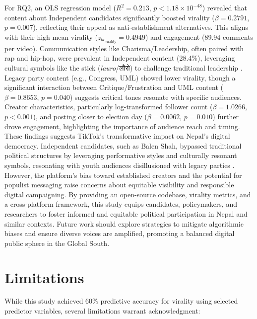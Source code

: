 \documentclass[12pt,a4paper]{report}
\begin{document}
For RQ2, an OLS regression model ($R^2 = 0.213$, $p < 1.18 \times 10^{-48}$) revealed that content about Independent candidates significantly boosted virality ($\beta = 0.2791$, $p = 0.007$), reflecting their appeal as anti-establishment alternatives. This aligns with their high mean virality ($z_{bc_{\text{virality}}} = 0.4949$) and engagement (89.94 comments per video). Communication styles like Charisma/Leadership, often paired with rap and hip-hop, were prevalent in Independent content (28.4\%), leveraging cultural symbols like the stick (\textit{lauro}/\texthindi{लौरो}) to challenge traditional leadership \parencite{AnnapurnaExpress2022}. Legacy party content (e.g., Congress, UML) showed lower virality, though a significant interaction between Critique/Frustration and UML content ($\beta = 0.8653$, $p = 0.040$) suggests critical tones resonate with specific audiences. Creator characteristics, particularly log-transformed follower count ($\beta = 1.0266$, $p < 0.001$), and posting closer to election day ($\beta = 0.0062$, $p = 0.010$) further drove engagement, highlighting the importance of audience reach and timing.
\newpage
These findings suggests TikTok’s transformative impact on Nepal’s digital democracy. Independent candidates, such as Balen Shah, bypassed traditional political structures by leveraging performative styles and culturally resonant symbols, resonating with youth audiences disillusioned with legacy parties \parencite{NepalNews2024}. However, the platform’s bias toward established creators and the potential for populist messaging raise concerns about equitable visibility and responsible digital campaigning. By providing an open-source codebase, virality metrics, and a cross-platform framework, this study equips candidates, policymakers, and researchers to foster informed and equitable political participation in Nepal and similar contexts. Future work should explore strategies to mitigate algorithmic biases and ensure diverse voices are amplified, promoting a balanced digital public sphere in the Global South.

\newpage
\section{Limitations}
\label{limitation}
While this study achieved 60\% predictive accuracy for virality using selected predictor variables, several limitations warrant acknowledgment:
\end{document}
